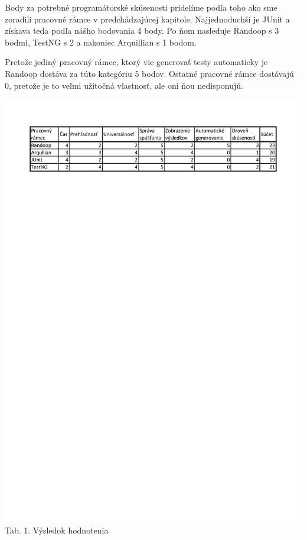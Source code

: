 \documentclass[11pt,twoside,slovak,a4paper]{article}
\begin{document}
	Body za potrebné programátorské skúsenosti pridelíme podľa toho ako sme zoradili pracovné rámce v predchádzajúcej kapitole. Najjednoduchší je JUnit a získava teda podľa nášho bodovania 4 body. Po ňom nasleduje Randoop s 3 bodmi, TestNG s 2 a nakoniec Arquillian s 1 bodom.	
	
	Pretože jediný pracovný rámec, ktorý vie generovať testy automaticky je Randoop dostáva za túto kategóriu 5 bodov. Ostatné pracovné rámce dostávajú 0, pretože je to veľmi užitočná vlastnosť, ale oni ňou nedisponujú.

	\begin{center}
		\includegraphics[width = 400pt, trim = 0pt 700pt 0pt 0pt]{tabulka}
		\newline
		\tiny Tab. 1. Výsledok hodnotenia
	\end{center}
		
\end{document}
